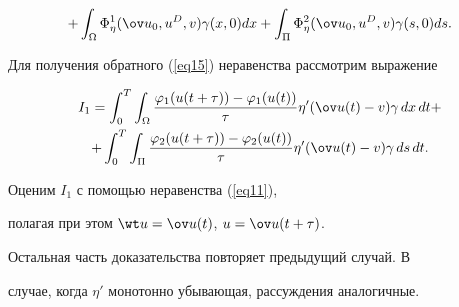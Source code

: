 \begin{pf}
\begin{multline}
%


+\int_{\Omega} \Phi_{\eta}^{1} (\ov u_{0}, u^{D}, v) \gamma (x,0) dx+


\int_{\Pi} \Phi_{\eta}^{2} (\ov u_{0}, u^{D}, v) \gamma (s,0) ds.


\end{multline} 





Для получения обратного (\ref{eq15}) неравенства рассмотрим выражение


\begin{multline*} 


I_{1}=\int_{0}^{T} \int_{\Omega}


\frac{\varphi_{1}(u(t+\tau))-\varphi_{1}(u(t))}


{\tau}{\eta}' (\ov u(t)-v) \gamma\, dx\, dt+ \\


%


+\int_{0}^{T} \int_{\Pi} \frac{\varphi_{2}(u(t+\tau))-\varphi_{2}(u(t))}


{\tau}{\eta}' (\ov u(t)-v) \gamma\, ds\, dt.


\end{multline*}





Оценим $I_{1}$ с помощью неравенства (\ref{eq11}),


полагая при этом $\wt u=\ov u(t)$, $ u=\ov u(t+\tau)$.


Остальная часть доказательства повторяет предыдущий случай. В 


случае, когда ${\eta}'$ монотонно убывающая, рассуждения аналогичные.


\end{pf}





